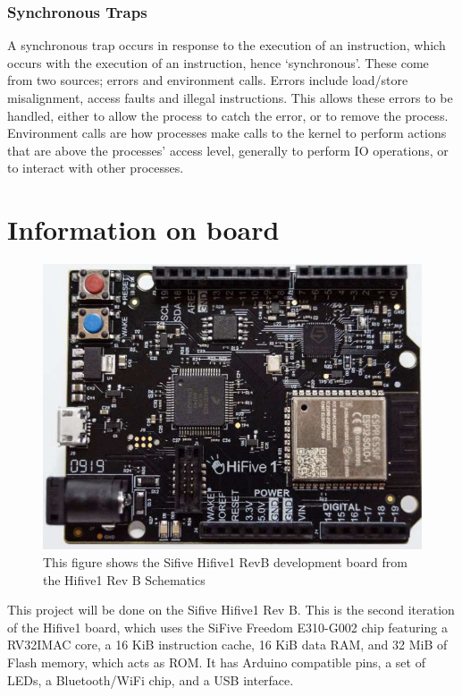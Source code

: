 \subsubsection{Synchronous Traps}
A synchronous trap occurs in response to the execution of an instruction, which occurs with the execution of an instruction, hence `synchronous'. These come from two sources; errors and environment calls. Errors include load/store misalignment, access faults and illegal instructions. This allows these errors to be handled, either to allow the process to catch the error, or to remove the process. Environment calls are how processes make calls to the kernel to perform actions that are above the processes' access level, generally to perform IO operations, or to interact with other processes.
\section{Information on board}
\begin{figure}[H]
    \includegraphics[width=0.6\columnwidth]{figures/board_image.png}
    \centering
    \caption[Sifive Hifive1 RevB]{This figure shows the Sifive Hifive1 RevB development board from the Hifive1 Rev B Schematics\cite{sifive_schematics}}
\end{figure}
This project will be done on the Sifive Hifive1 Rev B. This is the second iteration of the Hifive1 board, which uses the SiFive Freedom E310-G002 chip featuring a RV32IMAC core, a 16 KiB instruction cache, 16 KiB data RAM, and 32 MiB of Flash memory, which acts as ROM. It has Arduino compatible pins, a set of LEDs, a Bluetooth/WiFi chip, and a USB interface\cite{sifive_manual}.